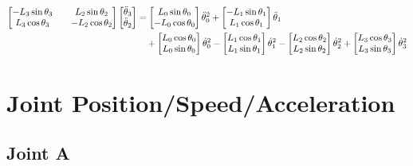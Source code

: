 \documentclass[letterpaper]{article}
\begin{document}
\begin{align}
	\begin{bmatrix} -L_3 \sin \theta_3 && L_2 \sin \theta_2 \\ L_3 \cos \theta_3 && -L_2 \cos \theta_2 \end{bmatrix} \begin{bmatrix} \ddot{\theta}_3 \\ \ddot{\theta}_2 \end{bmatrix} &= \begin{bmatrix} L_0 \sin \theta_0 \\ - L_0 \cos \theta_0 \end{bmatrix} \ddot{\theta}_0^2 + \begin{bmatrix} -L_1 \sin \theta_1 \\ L_1 \cos \theta_1 \end{bmatrix} \ddot{\theta}_1 \notag \\
		& \quad + \begin{bmatrix} L_0 \cos \theta_0 \\ L_0 \sin \theta_0 \end{bmatrix} \dot{\theta}_0^2- \begin{bmatrix} L_1 \cos \theta_1 \\ L_1 \sin \theta_1 \end{bmatrix} \dot{\theta}_1^2 - \begin{bmatrix} L_2 \cos \theta_2 \\ L_2 \sin \theta_2 \end{bmatrix} \dot{\theta}_2^2 + \begin{bmatrix} L_3 \cos \theta_3 \\ L_3 \sin \theta_3 \end{bmatrix} \dot{\theta}_3^2
\end{align}

\section{Joint Position/Speed/Acceleration}
\subsection{Joint A}
\end{document}
